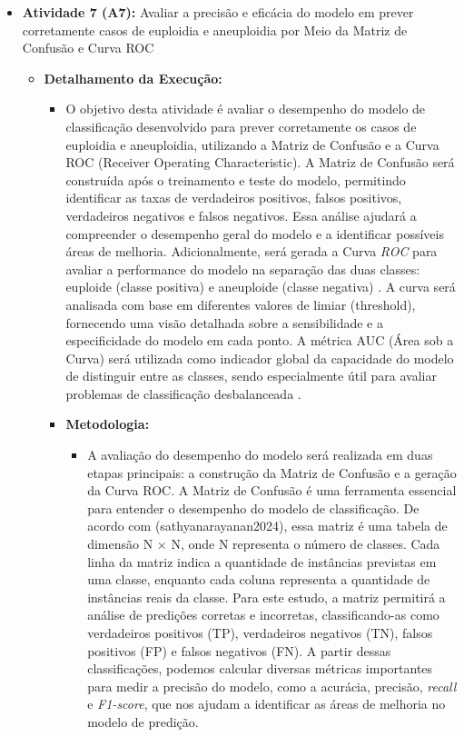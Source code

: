 \begin{itemize}
\begin{itemize}
\begin{itemize}
      \item \textbf{Atividade 7 (A7):} Avaliar a precisão e eficácia do modelo em prever corretamente casos de euploidia e aneuploidia  por Meio da Matriz de Confusão e Curva ROC
      \begin{itemize}
        \item \textbf{Detalhamento da Execução:} 
        \begin{itemize}
          \item O objetivo desta atividade é avaliar o desempenho do modelo de classificação desenvolvido para prever corretamente os casos de euploidia e aneuploidia, utilizando a Matriz de Confusão e a Curva ROC (Receiver Operating Characteristic). A Matriz de Confusão será construída após o treinamento e teste do modelo, permitindo identificar as taxas de verdadeiros positivos, falsos positivos, verdadeiros negativos e falsos negativos. Essa análise ajudará a compreender o desempenho geral do modelo e a identificar possíveis áreas de melhoria. Adicionalmente, será gerada a Curva \textit{ROC} para avaliar a performance do modelo na separação das duas classes: euploide (classe positiva) e aneuploide (classe negativa) \cite{vilela2022}. A curva será analisada com base em diferentes valores de limiar (threshold), fornecendo uma visão detalhada sobre a sensibilidade e a especificidade do modelo em cada ponto. A métrica AUC (Área sob a Curva) será utilizada como indicador global da capacidade do modelo de distinguir entre as classes, sendo especialmente útil para avaliar problemas de classificação desbalanceada \cite{vilela2022}.
        \item \textbf{Metodologia:} 
        \begin{itemize}
          \item A avaliação do desempenho do modelo será realizada em duas etapas principais: a construção da Matriz de Confusão e a geração da Curva ROC. A Matriz de Confusão é uma ferramenta essencial para entender o desempenho do modelo de classificação. De acordo com \citeonline(sathyanarayanan2024), essa matriz é uma tabela de dimensão N × N, onde N representa o número de classes. Cada linha da matriz indica a quantidade de instâncias previstas em uma classe, enquanto cada coluna representa a quantidade de instâncias reais da classe. Para este estudo, a matriz permitirá a análise de predições corretas e incorretas, classificando-as como verdadeiros positivos (TP), verdadeiros negativos (TN), falsos positivos (FP) e falsos negativos (FN). A partir dessas classificações, podemos calcular diversas métricas importantes para medir a precisão do modelo, como a acurácia, precisão, \textit{recall} e \textit{F1-score}, que nos ajudam a identificar as áreas de melhoria no modelo de predição. 

\end{itemize}
\end{itemize}
\end{itemize}
\end{itemize}
\end{itemize}
\end{itemize}
